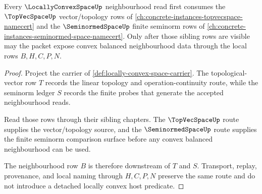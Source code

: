 \begin{theorem}
\label{thm:locally-convex-space-neighbourhood-sibling-route}
Every $\LocallyConvexSpaceUp$ neighbourhood read first consumes the $\TopVecSpaceUp$ vector/topology rows of \autoref{ch:concrete-instances-topvecspace-namecert} and the $\SeminormedSpaceUp$ finite seminorm rows of \autoref{ch:concrete-instances-seminormed-space-namecert}. Only after those sibling rows are visible may the packet expose convex balanced neighbourhood data through the local rows $B,H,C,P,N$.
\end{theorem}
\begin{proof}
Project the carrier of \autoref{def:locally-convex-space-carrier}. The topological-vector row $T$ records the linear topology and operation-continuity route, while the seminorm ledger $S$ records the finite probes that generate the accepted neighbourhood reads.

Read those rows through their sibling chapters. The $\TopVecSpaceUp$ route supplies the vector/topology source, and the $\SeminormedSpaceUp$ route supplies the finite seminorm comparison surface before any convex balanced neighbourhood can be used.

The neighbourhood row $B$ is therefore downstream of $T$ and $S$. Transport, replay, provenance, and local naming through $H,C,P,N$ preserve the same route and do not introduce a detached locally convex host predicate.
\end{proof}
